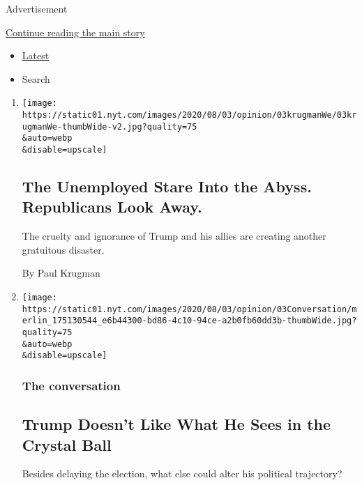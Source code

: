 Advertisement

\protect\hyperlink{after-mid1}{Continue reading the main story}

\begin{itemize}
\tightlist
\item
  \protect\hyperlink{stream-panel}{Latest}
\item
  Search
\end{itemize}

\begin{enumerate}
\def\labelenumi{\arabic{enumi}.}
\item
  \href{/2020/08/03/opinion/republicans-unemployed-coronavirus.html}{}

  \texttt{[image: https://static01.nyt.com/images/2020/08/03/opinion/03krugmanWe/03krugmanWe-thumbWide-v2.jpg?quality=75\\\&auto=webp\\\&disable=upscale]}

  \hypertarget{the-unemployed-stare-into-the-abyss-republicans-look-away}{%
  \subsection{The Unemployed Stare Into the Abyss. Republicans Look
  Away.}\label{the-unemployed-stare-into-the-abyss-republicans-look-away}}

  The cruelty and ignorance of Trump and his allies are creating another
  gratuitous disaster.

  By Paul Krugman
\item
  \href{/2020/08/03/opinion/trump-biden-2020.html}{}

  \texttt{[image: https://static01.nyt.com/images/2020/08/03/opinion/03Conversation/merlin\_175130544\_e6b44300-bd86-4c10-94ce-a2b0fb60dd3b-thumbWide.jpg?quality=75\\\&auto=webp\\\&disable=upscale]}

  \hypertarget{the-conversation}{%
  \subsubsection{The conversation}\label{the-conversation}}

  \hypertarget{trump-doesnt-like-what-he-sees-in-the-crystal-ball}{%
  \subsection{Trump Doesn't Like What He Sees in the Crystal
  Ball}\label{trump-doesnt-like-what-he-sees-in-the-crystal-ball}}

  Besides delaying the election, what else could alter his political
  trajectory?


\end{enumerate}
